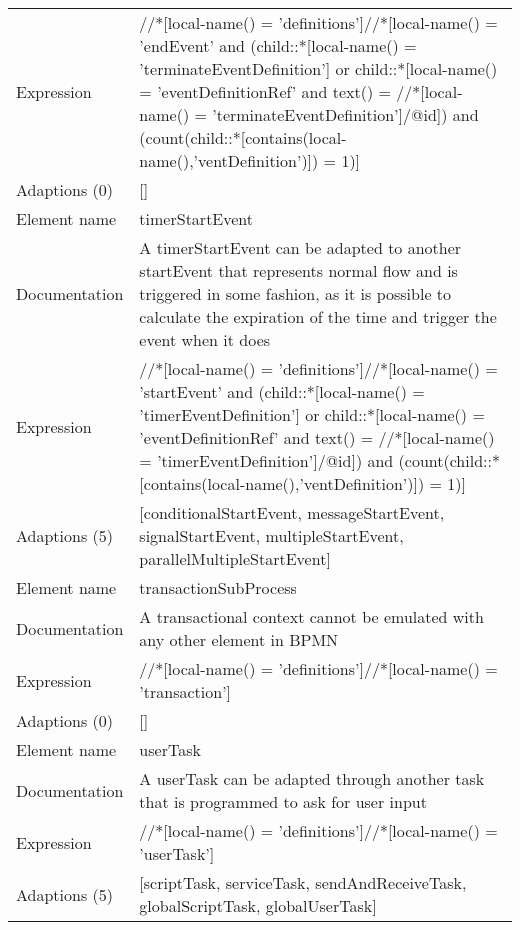 \begin{center}
\begin{tiny}
\begin{longtable}{p{}|p{}}
Expression & //*[local-name() = 'definitions']//*[local-name() = 'endEvent' and (child::*[local-name() = 'terminateEventDefinition'] or child::*[local-name() = 'eventDefinitionRef' and text() = //*[local-name() = 'terminateEventDefinition']/@id]) and (count(child::*[contains(local-name(),'ventDefinition')]) = 1)]\\
\myrowcolour
Adaptions (0) & []\\
\midrule
Element name & timerStartEvent\\
\myrowcolour
Documentation &A timerStartEvent can be adapted to another startEvent that represents normal flow and is triggered in some fashion, as it is possible to calculate the expiration of the time and trigger the event when it does\\
Expression & //*[local-name() = 'definitions']//*[local-name() = 'startEvent' and (child::*[local-name() = 'timerEventDefinition'] or child::*[local-name() = 'eventDefinitionRef' and text() = //*[local-name() = 'timerEventDefinition']/@id]) and (count(child::*[contains(local-name(),'ventDefinition')]) = 1)]\\
\myrowcolour
Adaptions (5) & [conditionalStartEvent, messageStartEvent, signalStartEvent, multipleStartEvent, parallelMultipleStartEvent]\\
\midrule
Element name & transactionSubProcess\\
\myrowcolour
Documentation &A transactional context cannot be emulated with any other element in BPMN\\
Expression & //*[local-name() = 'definitions']//*[local-name() = 'transaction']\\
\myrowcolour
Adaptions (0) & []\\
\midrule
Element name & userTask\\
\myrowcolour
Documentation &A userTask can be adapted through another task that is programmed to ask for user input\\
Expression & //*[local-name() = 'definitions']//*[local-name() = 'userTask']\\
\myrowcolour
Adaptions (5) & [scriptTask, serviceTask, sendAndReceiveTask, globalScriptTask, globalUserTask]\\
\end{longtable}
\end{tiny}
\end{center}
